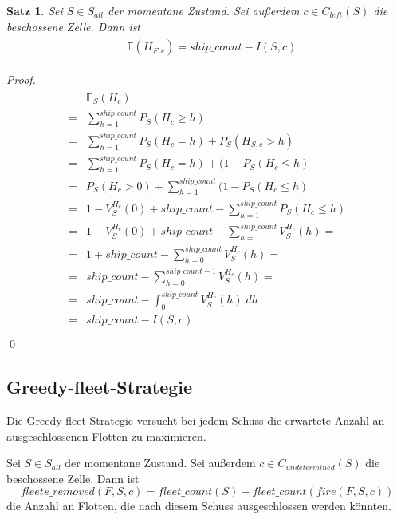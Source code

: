 \documentclass[a4paper,12pt]{llncs}
\numberwithin{equation}{section}
\newtheorem{satz}{Satz}
\begin{document}
\begin{satz}
Sei $S\in S_{all}$ der momentane Zustand.
Sei außerdem $c \in C_{left}(S)$ die beschossene Zelle.
Dann ist
\begin{align}
\begin{split}
&\mathds{E}(H_{F,c})=ship\_count - I(S,c)
\end{split}
\end{align}
\end{satz}

\begin{proof}
\begin{align}
\begin{split}
&\mathds{E}_S(H_{c})\\
=&\sum_{h=1}^{ship\_count} P_S(H_{c} \geq h)\\
=&\sum_{h=1}^{ship\_count} P_S(H_{c}=h) + P_S(H_{S,c} > h)\\
=&\sum_{h=1}^{ship\_count} P_S(H_{c}=h) + (1 - P_S(H_{c} \leq h)\\
=&P_S(H_{c} > 0) + \sum_{h=1}^{ship\_count} (1 - P_S(H_{c} \leq h)\\
=&1 - V_S^{H_{c}}(0) + ship\_count - \sum_{h=1}^{ship\_count} P_S(H_{c} \leq h)\\
=&1 - V_S^{H_{c}}(0) + ship\_count - \sum_{h=1}^{ship\_count} V_S^{H_{c}}(h)=\\
=&1 + ship\_count - \sum_{h=0}^{ship\_count} V_S^{H_{c}}(h)=\\
=&ship\_count - \sum_{h=0}^{ship\_count - 1} V_S^{H_{c}}(h)=\\
=&ship\_count - \int_{0}^{ship\_count} V_S^{H_{c}}(h) \; dh\\
=&ship\_count - I(S,c)\\
\end{split}
\end{align}
\qed
\end{proof}

\subsection{Greedy-fleet-Strategie}
Die Greedy-fleet-Strategie versucht bei jedem Schuss die erwartete Anzahl an ausgeschlossenen Flotten zu maximieren.

\begin{definition}
Sei $S\in S_{all}$ der momentane Zustand.
Sei außerdem $c \in C_{undetermined}(S)$ die beschossene Zelle.
Dann ist
\[
fleets\_removed(F, S, c)=fleet\_count(S) - fleet\_count(fire(F, S,c))
\]
die Anzahl an Flotten, die nach diesem Schuss ausgeschlossen werden könnten.
\end{definition}
\end{document}
